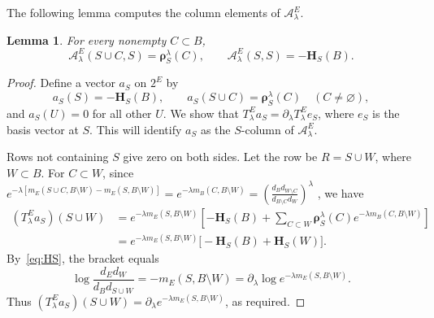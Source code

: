 \documentclass[11pt]{article}
\numberwithin{equation}{section}
\newcommand{\1}{\mathbf{1}}
\newtheorem{lemma}[theorem]{Lemma}
\newcommand{\Ac}{\mathcal A}
\newcommand{\bH}{\mathbf H}
\newcommand{\brho}{\boldsymbol{\rho}}
\begin{document}
The following lemma computes the column elements of $\Ac_\lambda^E$.

\begin{lemma}\label{lem:column-formula}
For every nonempty \(C\subset B\),
\[
        \Ac_\lambda^E(S\cup C,S)=\brho_S^\lambda(C),
        \qquad
        \Ac_\lambda^E(S,S)=-\bH_S(B).
\]
\end{lemma}

\begin{proof}
Define a vector \(a_S\) on \(2^E\) by
\[
        a_S(S)=-\bH_S(B),
        \qquad
        a_S(S\cup C)=\brho_S^\lambda(C)\quad(C\ne\varnothing),
\]
and \(a_S(U)=0\) for all other \(U\).  We show that
\(T_\lambda^Ea_S=\partial_\lambda T_\lambda^E e_S\), where \(e_S\) is the
basis vector at \(S\).  This will identify \(a_S\) as the \(S\)-column of
\(\Ac_\lambda^E\).

Rows not containing \(S\) give zero on both sides.  Let the row be
\(R=S\cup W\), where \(W\subset B\).  For \(C\subset W\), since
\(
 e^{-\lambda[m_E(S\cup C,B\setminus W)-m_E(S,B\setminus W)]}
 =e^{-\lambda m_B(C,B\setminus W)}
 =\left(\frac{d_Bd_{W\setminus C}}
 {d_{B\setminus C}d_W}\right)^\lambda
\)
, we have
\[
\begin{aligned}
        (T_\lambda^Ea_S)(S\cup W)
        &=e^{-\lambda m_E(S,B\setminus W)}
        \left[-\bH_S(B)+\sum_{C\subset W}
        \brho_S^\lambda(C)e^{-\lambda m_B(C,B\setminus W)}\right] \\
        &=e^{-\lambda m_E(S,B\setminus W)}
          \big[-\bH_S(B)+\bH_S(W)\big].
\end{aligned}
\]
By~\eqref{eq:HS}, the bracket equals
\[
        \log\frac{d_Ed_W}{d_Bd_{S\cup W}}
        =-m_E(S,B\setminus W)
        =\partial_\lambda\log e^{-\lambda m_E(S,B\setminus W)}.
\]
Thus \((T_\lambda^Ea_S)(S\cup W)=
\partial_\lambda e^{-\lambda m_E(S,B\setminus W)}\), as required.
\end{proof}
\end{document}
